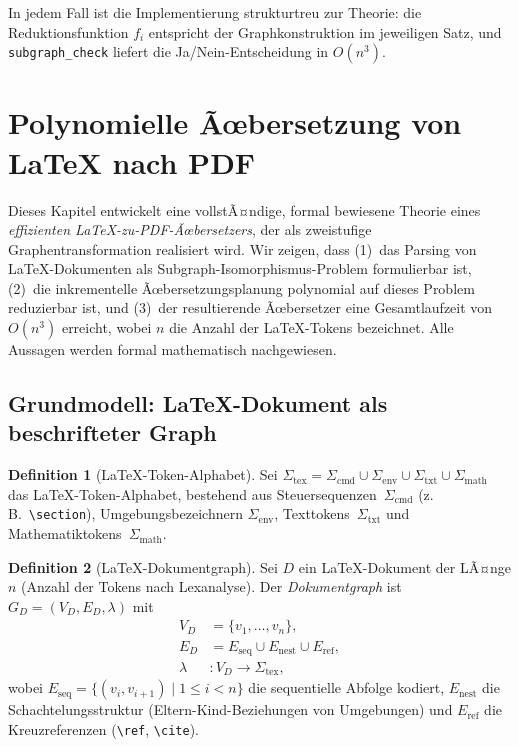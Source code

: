 ﻿\documentclass[a4paper,12pt]{article}
\theoremstyle{definition}
\newtheorem{definition}{Definition}
\begin{document}
In jedem Fall ist die Implementierung strukturtreu zur Theorie: die
Reduktionsfunktion $f_i$ entspricht der Graphkonstruktion im
jeweiligen Satz, und \texttt{subgraph\_check} liefert die Ja/Nein-Entscheidung
in $O(n^3)$.


\section{Polynomielle Ãœbersetzung von \LaTeX{} nach PDF}
\label{sec:latexuebersetzer}

Dieses Kapitel entwickelt eine vollstÃ¤ndige, formal bewiesene Theorie eines
\emph{effizienten \LaTeX-zu-PDF-Ãœbersetzers}, der als zweistufige
Graphentransformation realisiert wird. Wir zeigen, dass (1)~das Parsing von
\LaTeX-Dokumenten als Subgraph-Isomorphismus-Problem formulierbar ist,
(2)~die inkrementelle Ãœbersetzungsplanung polynomial auf dieses Problem
reduzierbar ist, und (3)~der resultierende Ãœbersetzer eine Gesamtlaufzeit
von $O(n^3)$ erreicht, wobei $n$ die Anzahl der \LaTeX-Tokens bezeichnet.
Alle Aussagen werden formal mathematisch nachgewiesen.

\subsection{Grundmodell: \LaTeX-Dokument als beschrifteter Graph}
\label{sec:ltx-grundmodell}

\begin{definition}[\LaTeX-Token-Alphabet]
	\label{def:ltx-alpha}
	Sei $\Sigma_{\mathrm{tex}} = \Sigma_{\mathrm{cmd}} \cup \Sigma_{\mathrm{env}}
	\cup \Sigma_{\mathrm{txt}} \cup \Sigma_{\mathrm{math}}$ das \LaTeX-Token-Alphabet,
	bestehend aus Steuersequenzen~$\Sigma_{\mathrm{cmd}}$
	(z.\,B.~\texttt{\textbackslash section}), Umgebungsbezeichnern
	$\Sigma_{\mathrm{env}}$, Texttokens~$\Sigma_{\mathrm{txt}}$ und
	Mathematiktokens~$\Sigma_{\mathrm{math}}$.
\end{definition}

\begin{definition}[\LaTeX-Dokumentgraph]
	\label{def:ltx-graph}
	Sei $D$ ein \LaTeX-Dokument der LÃ¤nge $n$ (Anzahl der Tokens nach Lexanalyse).
	Der \emph{Dokumentgraph} ist $G_D = (V_D, E_D, \lambda)$ mit
	\begin{align*}
		V_D &= \{v_1, \ldots, v_n\},\\
		E_D &= E_{\mathrm{seq}} \cup E_{\mathrm{nest}} \cup E_{\mathrm{ref}},\\
		\lambda &: V_D \to \Sigma_{\mathrm{tex}},
	\end{align*}
	wobei $E_{\mathrm{seq}} = \{(v_i, v_{i+1}) \mid 1 \le i < n\}$ die
	sequentielle Abfolge kodiert, $E_{\mathrm{nest}}$ die Schachtelungsstruktur
	(Eltern-Kind-Beziehungen von Umgebungen) und $E_{\mathrm{ref}}$ die
	Kreuzreferenzen (\texttt{\textbackslash ref}, \texttt{\textbackslash cite}).
\end{definition}
\end{document}
